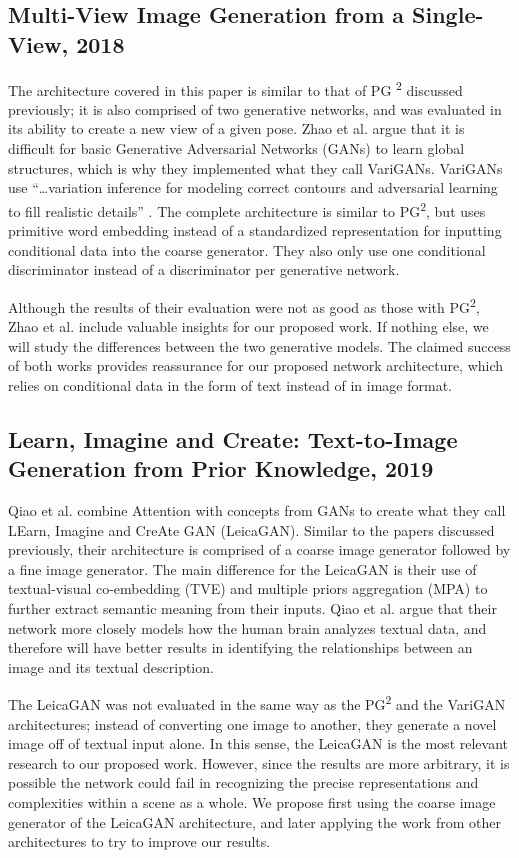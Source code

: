 \documentclass{article}
\begin{document}
\subsection*{Multi-View Image Generation from a Single-View, 2018}
\nocite{multi_view}
The architecture covered in this paper is similar to that of PG
\textsuperscript{2}
discussed previously; it is also comprised of two generative
networks, and was evaluated in its ability to create a new view of a given pose.
Zhao et al. argue that it is difficult for basic Generative Adversarial Networks
(GANs) to learn global structures, which is why they implemented what they
call VariGANs. VariGANs use
``\dots variation inference for modeling correct contours and adversarial
learning to fill realistic details'' \cite{multi_view}. The complete architecture
is similar to PG\textsuperscript{2}, but uses primitive word embedding instead of
a standardized representation for inputting conditional data into the coarse
generator. They also only use one conditional discriminator instead of a 
discriminator per generative network.

Although the results of their evaluation were not as good as those with
PG\textsuperscript{2}, Zhao et al. include valuable insights for
our proposed work. If nothing else, we will study the differences between the two
generative models. The claimed success of both works provides reassurance for our
proposed network architecture, which relies on conditional data in the form of
text instead of in image format.

\subsection*{Learn, Imagine and Create: Text-to-Image Generation from Prior Knowledge, 2019}
\nocite{leica}
Qiao et al. combine Attention with concepts from GANs to create what they call
LEarn, Imagine and CreAte GAN (LeicaGAN). Similar to the papers discussed
previously, their architecture is comprised of a coarse image generator followed
by a fine image generator. The main difference for the LeicaGAN is their use
of textual-visual co-embedding (TVE) and multiple priors aggregation (MPA)
to further extract semantic meaning from their inputs. Qiao et al. argue that
their network more closely models how the human brain analyzes textual data,
and therefore will have better results in identifying the relationships between
an image and its textual description.

The LeicaGAN was not evaluated in the same way as the PG\textsuperscript{2} and
the VariGAN architectures; instead of converting one image to another, they
generate a novel image off of textual input alone. In this sense, the LeicaGAN
is the most relevant research to our proposed work. However, since the results
are more arbitrary, it is possible the network could fail in recognizing the
precise representations and complexities within a scene as a whole.
We propose first using the coarse image generator of the LeicaGAN architecture,
and later applying the work from other architectures to try to improve
our results.
\end{document}
